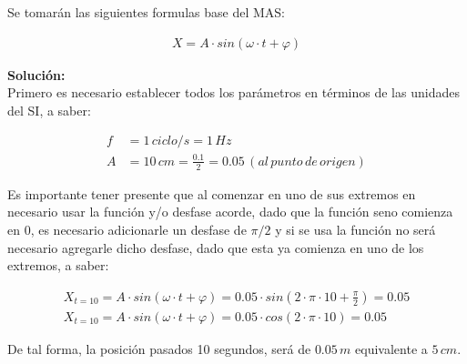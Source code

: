 \documentclass[11pt,letterpaper]{article}
\begin{document}
Se tomarán las siguientes formulas base del MAS:

\begin{align}
\boxed{ X = A \cdot sin (\omega \cdot t + \varphi)} 
\end{align}

\textbf{Solución:}\\

Primero es necesario establecer todos los parámetros en términos de las unidades del SI, a saber:

\begin{align}
f &= 1\,ciclo/s = 1\,Hz\\ 
A &= 10\,cm = \frac{0.1}{2} = 0.05\,(al\,punto\,de\,origen)
\end{align}

Es importante tener presente que al comenzar en uno de sus extremos en necesario usar la función y/o desfase acorde, dado que la función seno comienza en 0, es necesario adicionarle un desfase de $\pi/2$ y si se usa la función no será necesario agregarle dicho desfase, dado que esta ya comienza en uno de los extremos, a saber:

\begin{align}
X_{t=10} = A \cdot sin (\omega \cdot t + \varphi) = 0.05 \cdot sin(2 \cdot \pi \cdot 10 + \frac{\pi}{2}) = 0.05\\
X_{t=10} = A \cdot sin (\omega \cdot t + \varphi) = 0.05 \cdot cos(2 \cdot \pi \cdot 10) = 0.05
\end{align}

De tal forma, la posición pasados 10 segundos, será de $0.05\,m$ equivalente a $5\,cm$.

\end{document}
